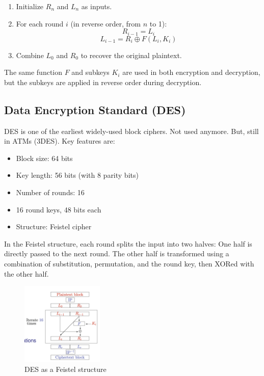\begin{enumerate}
    \item Initialize \( R_n \) and \( L_n \) as inputs.
    \item For each round \( i \) (in reverse order, from \( n \) to 1):
    \[
    R_{i-1} = L_i
    \]
    \[
    L_{i-1} = R_i \oplus F(L_i, K_i)
    \]
    \item Combine \( L_0 \) and \( R_0 \) to recover the original plaintext.
\end{enumerate}

The same function \( F \) and subkeys \( K_i \) are used in both encryption and decryption, but the subkeys are applied in reverse order during decryption.

\subsection{Data Encryption Standard (DES)}
DES is one of the earliest widely-used block ciphers. Not used anymore. But, still in ATMs (3DES). Key features are:

\begin{itemize}
    \item Block size: 64 bits
    \item Key length: 56 bits (with 8 parity bits)
    \item Number of rounds: 16
    \item 16 round keys, 48 bits each
    \item Structure: Feistel cipher
\end{itemize}

In the Feistel structure, each round splits the input into two halves: One half is directly passed to the next round. The other half is transformed using a combination of substitution, permutation, and the round key, then XORed with the other half.

\begin{figure}[h!]
    \centering
    \includegraphics[width=0.35\textwidth]{img/des.png}
    \caption{DES as a Feistel structure}
    \label{fig:des}
\end{figure}

